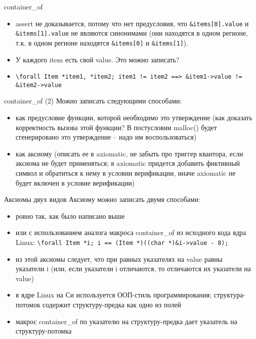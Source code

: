 \documentclass[hyperref={unicode=true}]{beamer}
\begin{document}
    \begin{frame}{container\_of}
    \begin{itemize}
    \item
    assert не доказывается, потому что нет предусловия, что
    \texttt{\&items[0].value} и \texttt{\&items[1].value}
    не являются синонимами (они находятся в одном регионе,
    т.к. в одном регионе находятся \texttt{\&items[0]} и
    \texttt{\&items[1]}).
    \item
    У каждого item есть свой value. Это можно записать?
    \item
    \texttt{\textbackslash{}forall Item *item1, *item2;
    item1 != item2 ==> \&item1->value != \&item2->value}
    \end{itemize}
    \end{frame}

    \begin{frame}{container\_of (2)}
    Можно записать следующими способами:
    \begin{itemize}
    \item как предусловие функции, которой необходимо это
    утверждение (как доказать корректность вызова этой
    функции? В постусловии malloc() будет сгенерировано
    это утверждение -- надо им воспользоваться)
    \item как аксиому (описать ее в axiomatic, не забыть
    про триггер квантора, если аксиома не будет применяться;
    в axiomatic придется добавить фиктивный символ
    и обратиться к нему в условии верификации, иначе
    axiomatic не будет включен в условие верификации)
    \end{itemize}
    \end{frame}

    \begin{frame}{Аксиомы двух видов}
    Аксиому можно записать двумя способами:
    \begin{itemize}
    \item ровно так, как было написано выше
    \item или с использованием аналога макроса
    container\_of из исходного кода ядра Linux:
    \texttt{\textbackslash{}forall Item *i; i ==
    (Item *)((char *)\&i->value - 8);}
    \item из этой аксиомы следует, что при равных
    указателях на value равны указатели i (или,
    если указатели i отличаются, то отличаются их
    указатели на value)
    \item в ядре Linux на Си используется ООП-стиль
    программирования; структура-потомок содержит
    структуру-предка как одно из полей
    \item макрос container\_of по указателю на
    структуру-предка дает указатель на структуру-потомка
    \end{itemize}
    \end{frame}
\end{document}
